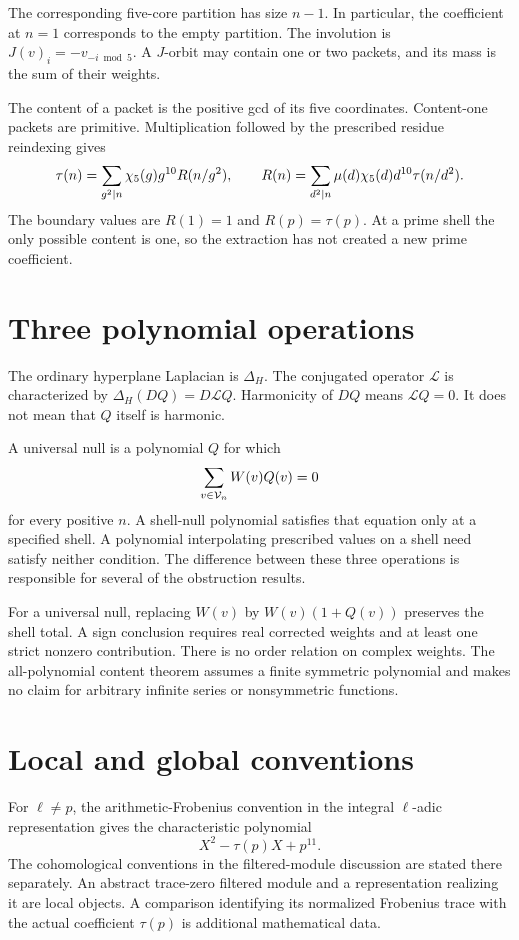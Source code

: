 The corresponding five-core partition has size $n-1$. In particular, the coefficient at $n=1$ corresponds to the empty partition. The involution is $J(v)_i=-v_{-i\bmod5}$. A $J$-orbit may contain one or two packets, and its mass is the sum of their weights.

The content of a packet is the positive gcd of its five coordinates. Content-one packets are primitive. Multiplication followed by the prescribed residue reindexing gives
\[
\tau(n)=\sum_{g^2\mid n}\chi_5(g)g^{10}R(n/g^2),
\qquad
R(n)=\sum_{d^2\mid n}\mu(d)\chi_5(d)d^{10}\tau(n/d^2).
\]
The boundary values are $R(1)=1$ and $R(p)=\tau(p)$. At a prime shell the only possible content is one, so the extraction has not created a new prime coefficient.

\section{Three polynomial operations}
The ordinary hyperplane Laplacian is $\Delta_H$. The conjugated operator $\mathcal L$ is characterized by $\Delta_H(DQ)=D\mathcal LQ$. Harmonicity of $DQ$ means $\mathcal LQ=0$. It does not mean that $Q$ itself is harmonic.

A universal null is a polynomial $Q$ for which
\[
\sum_{v\in\mathcal V_n}W(v)Q(v)=0
\]
for every positive $n$. A shell-null polynomial satisfies that equation only at a specified shell. A polynomial interpolating prescribed values on a shell need satisfy neither condition. The difference between these three operations is responsible for several of the obstruction results.

For a universal null, replacing $W(v)$ by $W(v)(1+Q(v))$ preserves the shell total. A sign conclusion requires real corrected weights and at least one strict nonzero contribution. There is no order relation on complex weights. The all-polynomial content theorem assumes a finite symmetric polynomial and makes no claim for arbitrary infinite series or nonsymmetric functions.

\section{Local and global conventions}
For $\ell\ne p$, the arithmetic-Frobenius convention in the integral $\ell$-adic representation gives the characteristic polynomial
\[
X^2-\tau(p)X+p^{11}.
\]
The cohomological conventions in the filtered-module discussion are stated there separately. An abstract trace-zero filtered module and a representation realizing it are local objects. A comparison identifying its normalized Frobenius trace with the actual coefficient $\tau(p)$ is additional mathematical data.

